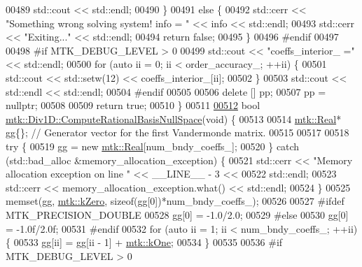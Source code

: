 \begin{DoxyCode}
{{00489     std::cout << std::endl;
00490   \}
00491   \textcolor{keywordflow}{else} \{
00492     std::cerr << \textcolor{stringliteral}{"Something wrong solving system! info = "} << info << std::endl;
00493     std::cerr << \textcolor{stringliteral}{"Exiting..."} << std::endl;
00494     \textcolor{keywordflow}{return} \textcolor{keyword}{false};
00495   \}
00496 \textcolor{preprocessor}{  #endif}
00497 
00498 \textcolor{preprocessor}{  #if MTK\_DEBUG\_LEVEL > 0}
00499   std::cout << \textcolor{stringliteral}{"coeffs\_interior\_ ="} << std::endl;
00500   \textcolor{keywordflow}{for} (\textcolor{keyword}{auto} ii = 0; ii < order\_accuracy\_; ++ii) \{
00501     std::cout << std::setw(12) << coeffs\_interior\_[ii];
00502   \}
00503   std::cout << std::endl << std::endl;
00504 \textcolor{preprocessor}{  #endif}
00505 
00506   \textcolor{keyword}{delete} [] pp;
00507   pp = \textcolor{keyword}{nullptr};
00508 
00509   \textcolor{keywordflow}{return} \textcolor{keyword}{true};
00510 \}
00511 
\hypertarget{mtk__div__1d_8cc_source_l00512}{}\hyperlink{classmtk_1_1Div1D_aa0c0c278b2c00a29c1ceaa70d31aebab}{00512} \textcolor{keywordtype}{bool} \hyperlink{classmtk_1_1Div1D_aa0c0c278b2c00a29c1ceaa70d31aebab}{mtk::Div1D::ComputeRationalBasisNullSpace}(\textcolor{keywordtype}{void}) \{
00513 
00514   \hyperlink{group__c01-roots_gac080bbbf5cbb5502c9f00405f894857d}{mtk::Real}* gg\{\}; \textcolor{comment}{// Generator vector for the first Vandermonde matrix.}
00515 
00517 
00518   \textcolor{keywordflow}{try} \{
00519     gg = \textcolor{keyword}{new} \hyperlink{group__c01-roots_gac080bbbf5cbb5502c9f00405f894857d}{mtk::Real}[num\_bndy\_coeffs\_];
00520   \} \textcolor{keywordflow}{catch} (std::bad\_alloc &memory\_allocation\_exception) \{
00521     std::cerr << \textcolor{stringliteral}{"Memory allocation exception on line "} << \_\_LINE\_\_ - 3 <<
00522       std::endl;
00523     std::cerr << memory\_allocation\_exception.what() << std::endl;
00524   \}
00525   memset(gg, \hyperlink{group__c01-roots_ga59a451a5fae30d59649bcda274fea271}{mtk::kZero}, \textcolor{keyword}{sizeof}(gg[0])*num\_bndy\_coeffs\_);
00526 
00527 \textcolor{preprocessor}{  #ifdef MTK\_PRECISION\_DOUBLE}
00528   gg[0] = -1.0/2.0;
00529 \textcolor{preprocessor}{  #else}
00530   gg[0] = -1.0f/2.0f;
00531 \textcolor{preprocessor}{  #endif}
00532   \textcolor{keywordflow}{for} (\textcolor{keyword}{auto} ii = 1; ii < num\_bndy\_coeffs\_; ++ii) \{
00533     gg[ii] = gg[ii - 1] + \hyperlink{group__c01-roots_ga26407c24d43b6b95480943340d285c71}{mtk::kOne};
00534   \}
00535 
00536 \textcolor{preprocessor}{  #if MTK\_DEBUG\_LEVEL > 0}
}}
\end{DoxyCode}
